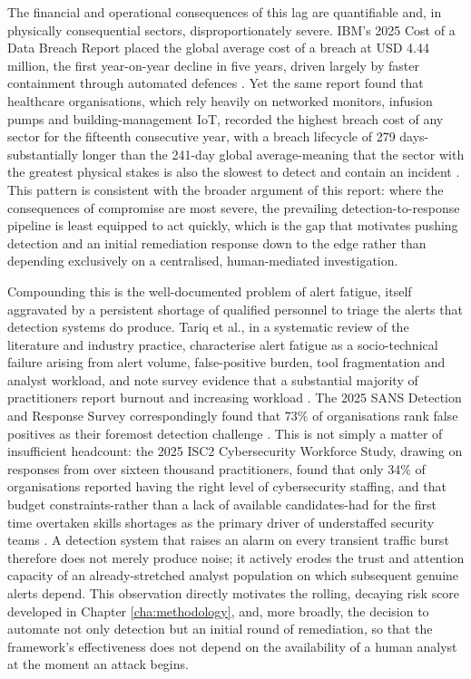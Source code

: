 The financial and operational consequences of this lag are quantifiable and, in physically consequential sectors, disproportionately severe. IBM's 2025 Cost of a Data Breach Report placed the global average cost of a breach at USD 4.44 million, the first year-on-year decline in five years, driven largely by faster containment through automated defences \cite{IBM2025}. Yet the same report found that healthcare organisations, which rely heavily on networked monitors, infusion pumps and building-management IoT, recorded the highest breach cost of any sector for the fifteenth consecutive year, with a breach lifecycle of 279 days-substantially longer than the 241-day global average-meaning that the sector with the greatest physical stakes is also the slowest to detect and contain an incident \cite{IBM2025}. This pattern is consistent with the broader argument of this report: where the consequences of compromise are most severe, the prevailing detection-to-response pipeline is least equipped to act quickly, which is the gap that motivates pushing detection and an initial remediation response down to the edge rather than depending exclusively on a centralised, human-mediated investigation.

Compounding this is the well-documented problem of alert fatigue, itself aggravated by a persistent shortage of qualified personnel to triage the alerts that detection systems do produce. Tariq et al., in a systematic review of the literature and industry practice, characterise alert fatigue as a socio-technical failure arising from alert volume, false-positive burden, tool fragmentation and analyst workload, and note survey evidence that a substantial majority of practitioners report burnout and increasing workload \cite{Tariq2025}. The 2025 SANS Detection and Response Survey correspondingly found that 73\% of organisations rank false positives as their foremost detection challenge \cite{SANS2025}. This is not simply a matter of insufficient headcount: the 2025 ISC2 Cybersecurity Workforce Study, drawing on responses from over sixteen thousand practitioners, found that only 34\% of organisations reported having the right level of cybersecurity staffing, and that budget constraints-rather than a lack of available candidates-had for the first time overtaken skills shortages as the primary driver of understaffed security teams \cite{ISC22025}. A detection system that raises an alarm on every transient traffic burst therefore does not merely produce noise; it actively erodes the trust and attention capacity of an already-stretched analyst population on which subsequent genuine alerts depend. This observation directly motivates the rolling, decaying risk score developed in Chapter \ref{cha:methodology}, and, more broadly, the decision to automate not only detection but an initial round of remediation, so that the framework's effectiveness does not depend on the availability of a human analyst at the moment an attack begins.

